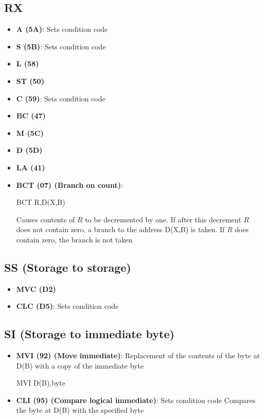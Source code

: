 \documentclass{report}
\begin{document}
    \subsection{RX}
    \begin{itemize}
        \item \textbf{A (5A)}: Sets condition code
        \item \textbf{S (5B)}: Sets condition code
        \item \textbf{L (58)}
        \item \textbf{ST (50)}
        \item \textbf{C (59)}: Sets condition code
        \item \textbf{BC (47)}
        \item \textbf{M (5C)}
        \item \textbf{D (5D)}
        \item \textbf{LA (41)}
        \item \textbf{BCT (07) (Branch on count)}:
            \bigbreak \noindent 
            \begin{cppcode}
            BCT   R,D(X,B)
            \end{cppcode}
            \bigbreak \noindent 
            Causes contents of $R$  to be decremented by one. If after this decrement $R$ does not contain zero, a branch to the address D(X,B) is taken. If $R$ does contain zero, the branch is not taken
    \end{itemize}

    \bigbreak \noindent 
    \subsection{SS (Storage to storage)}
    \begin{itemize}
        \item \textbf{MVC (D2)}
        \item \textbf{CLC (D5)}: Sets condition code
    \end{itemize}

    \bigbreak \noindent 
    \subsection{SI (Storage to immediate byte)}
    \begin{itemize}
        \item \textbf{MVI (92) (Move immediate)}: Replacement of the contents of the byte at D(B) with a copy of the immediate byte
            \bigbreak \noindent 
            \begin{cppcode}
            MVI   D(B),byte
            \end{cppcode}
        \item \textbf{CLI (95) (Compare logical immediate)}: Sets condition code
            \bigbreak \noindent 
            Compares the byte at D(B) with the specified byte
    \end{itemize}
\end{document}
